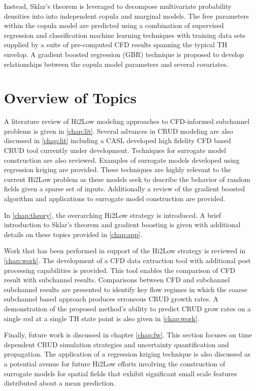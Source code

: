 Instead, Sklar's theorem is leveraged to decompose multivariate probability
densities into into independent copula and marginal models. The free parameters
within the copula model are predicted using a combination of supervised
regression and classification machine learning techniques with training data
sets supplied by a suite of pre-computed CFD results spanning the typical TH
envelop. A gradient boosted regression
(GBR) technique is proposed to develop relationships between the copula
model parameters and several covariates.


\section{Overview of Topics}

A literature review of Hi2Low modeling approaches to CFD-informed subchannel
problems is given in \autoref{chap:lit}.  Several advances in CRUD modeling are
also discussed in \autoref{chap:lit} including a CASL developed high fidelity
CFD based CRUD tool currently under development.  Techniques for surrogate
model construction are also reviewed.  Examples of surrogate models developed
using regression kriging are provided.  These techniques are highly relevant to
the current Hi2Low problem as these models seek to describe the behavior of
random fields given a sparse set of inputs.  Additionally a review of the
gradient boosted algorithm and applications to surrogate model construction are
provided.

In \autoref{chap:theory}, the overarching Hi2Low strategy is introduced.  A
brief introduction to Sklar's theorem and gradient boosting is given with
additional details on these topics provided in \autoref{chap:app}.

Work that has been performed in support of the Hi2Low strategy is reviewed in
\autoref{chap:work}.  The development of a CFD data extraction tool with
additional post processing capabilities is provided.  This tool enables the
comparison of CFD result with subchannel results.  Comparisons between CFD and
subchannel subchannel results are presented to identify key flow regimes in
which the coarse subchannel based approach produces erroneous CRUD growth
rates.  A demonstration of the proposed method's ability to predict CRUD grow
rates on a single rod at a single TH state point is also given in
\autoref{chap:work}.

Finally, future work is discussed in chapter \autoref{chap:fw}.  This section
focuses on time dependent CRUD simulation strategies and uncertainty
quantification and propagation.  The application of a regression kriging
technique is also discussed as a potential avenue for future Hi2Low efforts
involving the construction of surrogate models for spatial fields that exhibit
significant small scale features distributed about a mean prediction.

